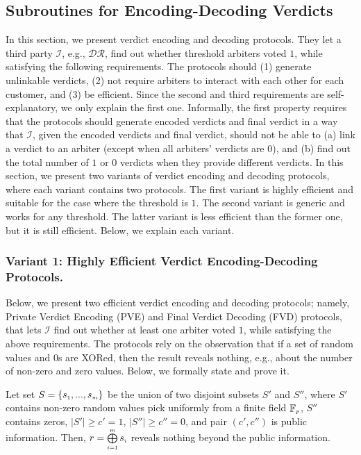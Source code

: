 
\subsection{Subroutines for  Encoding-Decoding Verdicts}


In this section, we present verdict encoding and decoding protocols. They let a third party $\mathcal{I}$, e.g., $\mathcal{DR}$, find out whether threshold  arbiters voted $1$, while satisfying the following  requirements.  The protocols should (1) generate unlinkable verdicts, (2)  not require arbiters to interact with each other for each customer, and (3) be  efficient. Since the second and third requirements are self-explanatory,  we only explain the first one.  Informally, the first property requires  that the protocols should generate encoded verdicts and final verdict in a way that $\mathcal{I}$,  given the encoded verdicts and final verdict, should not be able to (a)   link a  verdict to an arbiter (except when all arbiters' verdicts are $0$), and (b) find out the total number of $1$ or $0$ verdicts when they provide different verdicts.  In this section, we present two variants of verdict encoding and decoding protocols, where each variant contains two protocols. The first variant is highly efficient and suitable for the case where the threshold is $1$. The second variant is  generic and works for any threshold. The latter variant is less efficient than the former one, but it is still efficient. Below, we explain each variant. 


\subsubsection{Variant 1: Highly Efficient Verdict  Encoding-Decoding Protocols.}


Below, we present two efficient verdict encoding and decoding protocols; namely, Private Verdict Encoding (PVE) and Final Verdict Decoding (FVD) protocols, that lets $\mathcal{I}$ find out whether at least one arbiter voted $1$, while satisfying the above requirements.  The protocols rely on the observation that if   a set of random values and $0$s are XORed, then the result   reveals nothing, e.g.,  about the number of non-zero and  zero values. Below, we formally state and prove it.  

\begin{theorem}\label{set-xor}
Let set $S=\{s_{\scriptscriptstyle 1},..., s_{\scriptscriptstyle m}\}$ be the union of  two disjoint subsets $S'$ and $S''$, where $S'$ contains non-zero random values pick uniformly  from a finite field $\mathbb{F}_{\scriptscriptstyle p}$, $S''$ contains zeros, $|S'|\geq c'=1$, $|S''|\geq c''=0$, and pair $(c',c'')$ is public information. Then, $r= \bigoplus\limits^{\scriptscriptstyle m}_{\scriptscriptstyle i=1} s_{\scriptscriptstyle i}$ reveals nothing beyond the public information.  
\end{theorem}

